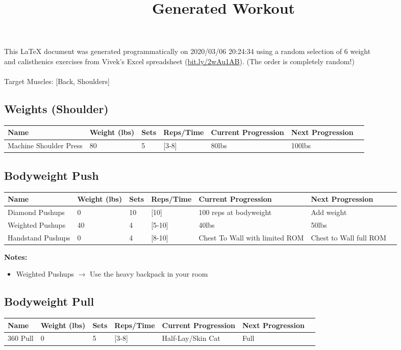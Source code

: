 \documentclass{article}
\title{Generated Workout}
\date{\vspace{-5ex}}
\begin{document}
\maketitle
\noindent This LaTeX document was generated programmatically on 2020/03/06 20:24:34 using a random selection of 6 weight\\ and calisthenics exercises from Vivek's Excel spreadsheet (\url{bit.ly/2wAu1AB}). (The order is completely random!)\\\\
Target Muscles: [Back, Shoulders]\subsection*{Weights (Shoulder)}
\begin{table}[H]
\begin{tabular}{lllllll}
\hline
\textbf{Name}    & \textbf{Weight (lbs)} & \textbf{Sets} & \multicolumn{1}{l}{\textbf{Reps/Time}} & \multicolumn{1}{l}{\textbf{Current Progression}} & \multicolumn{1}{l}{\textbf{Next Progression}}\\ \hline
 Machine Shoulder Press&80&5&[3-8]&80lbs&100lbs\\\end{tabular}
\end{table}
\subsection*{Bodyweight Push}
\begin{table}[H]
\begin{tabular}{lllllll}
\hline
\textbf{Name}    & \textbf{Weight (lbs)} & \textbf{Sets} & \multicolumn{1}{l}{\textbf{Reps/Time}} & \multicolumn{1}{l}{\textbf{Current Progression}} & \multicolumn{1}{l}{\textbf{Next Progression}}\\ \hline
 Diamond Pushups&0&10&[10]&100 reps at bodyweight&Add weight\\ Weighted Pushups&40&4&[5-10]&40lbs&50lbs\\ Handstand Pushups&0&4&[8-10]&Chest To Wall with limited ROM&Chest to Wall full ROM\\\end{tabular}
\end{table}
\textbf{Notes:}
\begin{itemize}
\item  Weighted Pushups $\rightarrow$ Use the heavy backpack in your room
\end{itemize}
\subsection*{Bodyweight Pull}
\begin{table}[H]
\begin{tabular}{lllllll}
\hline
\textbf{Name}    & \textbf{Weight (lbs)} & \textbf{Sets} & \multicolumn{1}{l}{\textbf{Reps/Time}} & \multicolumn{1}{l}{\textbf{Current Progression}} & \multicolumn{1}{l}{\textbf{Next Progression}}\\ \hline
 360 Pull&0&5&[3-8]&Half-Lay/Skin Cat&Full\\\end{tabular}
\end{table}
\end{document}
